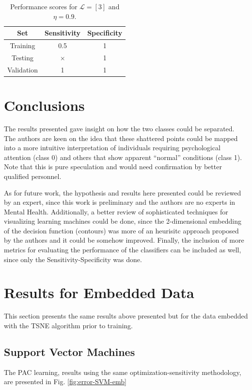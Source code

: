\documentclass[conference]{IEEEtran}
\theoremstyle{definition}
\theoremstyle{remark}
\theoremstyle{remark}
\begin{document}
\begin{table}
\centering
\caption{Performance scores for $\mathcal{L}=[3]$ and $\eta=0.9$.}
\label{tab:L3}
\begin{tabular}{ccc}
\hline
\textbf{Set} & \textbf{Sensitivity} & \textbf{Specificity} \\ \hline
Training & 0.5 & 1 \\
Testing & $\times$ & 1 \\
Validation & 1 & 1 \\ \hline
\end{tabular}
\end{table}

\section{Conclusions}\label{sec:conc}
The results presented gave insight on how the two classes could be separated.
The authors are keen on the idea that these shattered points could be mapped
into a more intuitive interpretation of individuals requiring psychological
attention (class 0) and others that show apparent ``normal'' conditions (class
1). Note that this is pure speculation and would need confirmation by better
qualified personnel.

As for future work, the hypothesis and results here presented could be reviewed
by an expert, since this work is preliminary and the authors are no experts in
Mental Health. Additionally, a better review of sophisticated techniques for
visualizing learning machines could be done, since the 2-dimensional embedding
of the decision function (contours) was more of an heurisitc approach proposed
by the authors and it could be somehow improved. Finally, the inclusion of more
metrics for evaluating the performance of the classifiers can be included as
well, since only the Sensitivity-Specificity was done.

\printbibliography

\newpage
\appendices

\section{Results for Embedded Data}\label{app:emb}
This section presents the same results above presented but for the data
embedded with the TSNE algorithm prior to training.

\subsection{Support Vector Machines}
The PAC learning, results using the same optimization-sensitivity methodology,
are presented in Fig. \ref{fig:error-SVM-emb}
\end{document}
